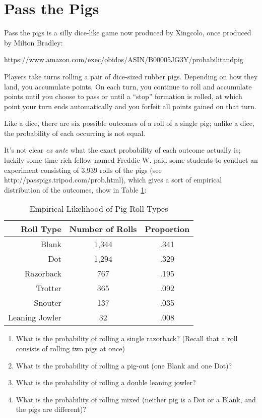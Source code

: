 \documentclass{article}
\begin{document}
\section{Pass the Pigs}

Pass the pigs is a silly dice-like game now produced by Xingcolo, once produced by Milton Bradley:

https://www.amazon.com/exec/obidos/ASIN/B00005JG3Y/probabilitandpig

Players take turns rolling a pair of dice-sized rubber pigs. Depending on how they land, you accumulate points. On each turn, you continue to roll and accumulate points until you choose to pass or until a ``stop'' formation is rolled, at which point your turn ends automatically and you forfeit all points gained on that turn. 

Like a dice, there are six possible outcomes of a roll of a single pig; unlike a dice, the probability of each occurring is not equal.

It's not clear \textit{ex ante} what the exact probability of each outcome actually is; luckily some time-rich fellow named Freddie W. paid some students to conduct an experiment consisting of 3,939 rolls of the pigs (see http://passpigs.tripod.com/prob.html), which gives a sort of empirical distribution of the outcomes, show in Table \ref{tbl:pigout}:

\begin{table}[htbp]
\centering
\begin{tabular}{|r|c|c|}
\hline
Roll Type & Number of Rolls & Proportion \\
\hline
Blank & 1,344 & .341 \\
\hline
Dot & 1,294 & .329 \\
\hline
Razorback & 767 & .195 \\
\hline
Trotter & 365 & .092 \\
\hline
Snouter & 137 & .035 \\
\hline
Leaning Jowler & 32 & .008 \\
\hline
\end{tabular}
\caption{Empirical Likelihood of Pig Roll Types}
\label{tbl:pigout}
\end{table}

\begin{enumerate}
\item What is the probability of rolling a single razorback? (Recall that a roll consists of rolling two pigs at once)
\item What is the probability of rolling a pig-out (one Blank and one Dot)?
\item What is the probability of rolling a double leaning jowler?
\item What is the probability of rolling mixed (neither pig is a Dot or a Blank, and the pigs are different)?
\end{enumerate}
\end{document}
